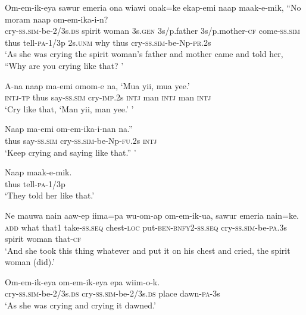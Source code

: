 \ea
\gll  Om-em-ik-eya  sawur  emeria  ona  wiawi  onak=ke                     ekap-emi  naap  maak-e-mik,  “No  moram  naap  om-em-ika-i-n? \\
cry-\textsc{ss}.\textsc{sim}-be-2/3s.\textsc{ds}  spirit  woman  3s.\textsc{gen}  3s/p.father  3s/p.mother-\textsc{cf}  come-\textsc{ss}.\textsc{sim}  thus  tell-\textsc{pa}-1/3p  2s.\textsc{unm}  why  thus  cry-\textsc{ss}.\textsc{sim}-be-Np-\textsc{pr}.2s \\


\glt ‘As she was crying the spirit woman’s father and mother came and told her, “Why are you crying like that? ’ \\
\z


\ea
\gll  A-na  naap  ma-emi  omom-e  na,  ‘Mua  yii,  mua  yee.’ \\
\textsc{intj}-\textsc{tp}  thus  say-\textsc{ss}.\textsc{sim}  cry-\textsc{imp}.2s  \textsc{intj}  man  \textsc{intj}  man  \textsc{intj} \\
\glt ‘Cry like that, ‘Man yii, man yee.’ ’ \\
\z


\ea
\gll  Naap  ma-emi  om-em-ika-i-nan  na.” \\
thus  say-\textsc{ss}.\textsc{sim}  cry-\textsc{ss}.\textsc{sim}-be-Np-\textsc{fu}.2s  \textsc{intj} \\
\glt ‘Keep crying and saying like that.” ’ \\
\z


\ea
\gll  Naap  maak-e-mik. \\
thus  tell-\textsc{pa}-1/3p \\
\glt ‘They told her like that.’ \\
\z


\ea
\gll  Ne  mauwa  nain  aaw-ep  iima=pa  wu-om-ap                 om-em-ik-ua,  sawur  emeria  nain=ke. \\
\textsc{add}  what  that1  take-\textsc{ss.seq}  chest-\textsc{loc}  put-\textsc{ben}-\textsc{bnfy}2-\textsc{ss.seq}   cry-\textsc{ss}.\textsc{sim}-be-\textsc{pa}.3s  spirit  woman  that-\textsc{cf} \\


\glt ‘And she took this thing whatever and put it on his chest and cried, the spirit woman (did).’ \\
\z


\ea
\gll  Om-em-ik-eya  om-em-ik-eya  epa  wiim-o-k. \\
cry-\textsc{ss}.\textsc{sim}-be-2/3s.\textsc{ds}  cry-\textsc{ss}.\textsc{sim}-be-2/3s.\textsc{ds}  place  dawn-\textsc{pa}-3s \\
\glt ‘As she was crying and crying it dawned.’ \\
\z


